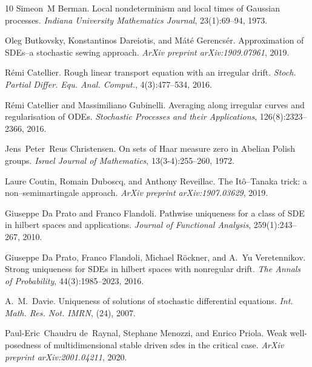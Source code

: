 \documentclass[10pt]{article}
\newcommand{\tmtextit}[1]{{\itshape{#1}}}
\begin{document}
\begin{thebibliography}{10}
  Simeon~M Berman. {\newblock}Local nondeterminism and
  local times of Gaussian processes. {\newblock}\tmtextit{Indiana University
  Mathematics Journal}, 23(1):69--94, 1973.{\newblock}
  
  Oleg Butkovsky, Konstantinos Dareiotis, and 
  M{\'a}t{\'e} Gerencs{\'e}r. {\newblock}Approximation of SDEs--a stochastic
  sewing approach. {\newblock}\tmtextit{ArXiv preprint arXiv:1909.07961},
  2019.{\newblock}
  
  R{\'e}mi Catellier. {\newblock}Rough linear transport
  equation with an irregular drift. {\newblock}\tmtextit{Stoch. Partial
  Differ. Equ. Anal. Comput.}, 4(3):477--534, 2016.{\newblock}
  
  R{\'e}mi Catellier  and  Massimiliano
  Gubinelli. {\newblock}Averaging along irregular curves and regularisation of
  ODEs. {\newblock}\tmtextit{Stochastic Processes and their Applications},
  126(8):2323--2366, 2016.{\newblock}
  
  Jens~Peter~Reus Christensen. {\newblock}On sets of
  Haar measure zero in Abelian Polish groups. {\newblock}\tmtextit{Israel
  Journal of Mathematics}, 13(3-4):255--260, 1972.{\newblock}
  
  Laure Coutin, Romain Duboscq, and  Anthony Reveillac.
  {\newblock}The It{\^o}--Tanaka trick: a non--semimartingale approach.
  {\newblock}\tmtextit{ArXiv preprint arXiv:1907.03629}, 2019.{\newblock}
  
  Giuseppe Da Prato  and  Franco Flandoli.
  {\newblock}Pathwise uniqueness for a class of SDE in hilbert spaces and
  applications. {\newblock}\tmtextit{Journal of Functional Analysis},
  259(1):243--267, 2010.{\newblock}
  
  Giuseppe Da Prato, Franco Flandoli, Michael R{\"o}ckner,
  and  A.~Yu Veretennikov. {\newblock}Strong uniqueness for SDEs in hilbert
  spaces with nonregular drift. {\newblock}\tmtextit{The Annals of
  Probability}, 44(3):1985--2023, 2016.{\newblock}
  
  A.~M.~Davie. {\newblock}Uniqueness of solutions of
  stochastic differential equations. {\newblock}\tmtextit{Int. Math. Res. Not.
  IMRN}, (24), 2007.{\newblock}
  
  Paul-Eric~Chaudru de~Raynal, Stephane Menozzi, and 
  Enrico Priola. {\newblock}Weak well-posedness of multidimensional stable
  driven sdes in the critical case. {\newblock}\tmtextit{ArXiv preprint
  arXiv:2001.04211}, 2020.{\newblock}
  

\end{thebibliography}
\end{document}
